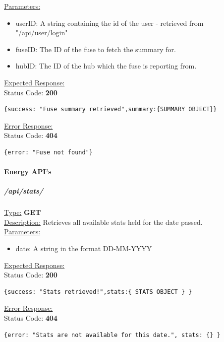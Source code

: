 \documentclass[draft,preprint,12pt,3p]{elsarticle}
\newcommand{\forceindent}{\leavevmode{\parindent=1em\indent}}
\begin{document}
\underline{Parameters:}
\begin{itemize}
\item userID: A string containing the id of the user - retrieved from "/api/user/login"

\item fuseID: The ID of the fuse to fetch the summary for.

\item hubID: The ID of the hub which the fuse is reporting from.

\end{itemize}
\underline{Expected Response:}\\[5pt]
\forceindent Status Code: \textbf{200} \\
\begin{verbatim}
{success: "Fuse summary retrieved",summary:{SUMMARY OBJECT}}
\end{verbatim}
\underline{Error Response:}\\[5pt]
\forceindent Status Code: \textbf{404} \\
\begin{verbatim}
{error: "Fuse not found"}
\end{verbatim}

\paragraph{Energy API's}
\subparagraph*{/api/stats/}
\underline{Type:} \textbf{GET}\\

\underline{Description:} Retrieves all available stats held for the date passed.\\

\underline{Parameters:}

\begin{itemize}
\item date: A string in the format DD-MM-YYYY
\end{itemize}

\underline{Expected Response:}\\[5pt]
\forceindent Status Code: \textbf{200} \\
\begin{verbatim}
{success: "Stats retrieved!",stats:{ STATS OBJECT } }
\end{verbatim}
\underline{Error Response:}\\[5pt]
\forceindent Status Code: \textbf{404} \\
\begin{verbatim}
{error: "Stats are not available for this date.", stats: {} }
\end{verbatim}
\end{document}
